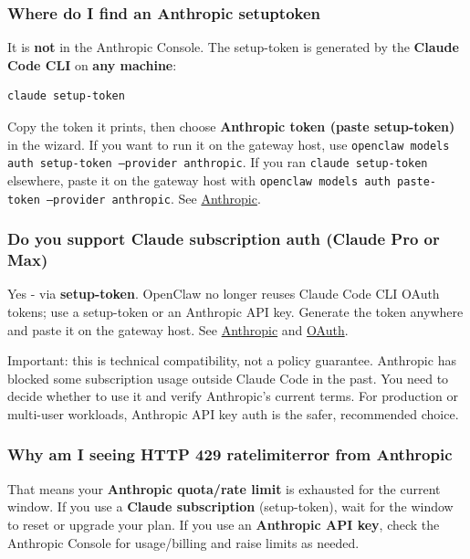 \subsubsection{Where do I find an Anthropic setuptoken}


It is \textbf{not} in the Anthropic Console. The setup-token is generated by the \textbf{Claude Code CLI} on \textbf{any machine}:

\begin{lstlisting}[language=bash]
claude setup-token
\end{lstlisting}


Copy the token it prints, then choose \textbf{Anthropic token (paste setup-token)} in the wizard. If you want to run it on the gateway host, use \texttt{openclaw models auth setup-token --provider anthropic}. If you ran \texttt{claude setup-token} elsewhere, paste it on the gateway host with \texttt{openclaw models auth paste-token --provider anthropic}. See \href{/providers/anthropic}{Anthropic}.

\subsubsection{Do you support Claude subscription auth (Claude Pro or Max)}


Yes - via \textbf{setup-token}. OpenClaw no longer reuses Claude Code CLI OAuth tokens; use a setup-token or an Anthropic API key. Generate the token anywhere and paste it on the gateway host. See \href{/providers/anthropic}{Anthropic} and \href{/concepts/oauth}{OAuth}.

Important: this is technical compatibility, not a policy guarantee. Anthropic
has blocked some subscription usage outside Claude Code in the past.
You need to decide whether to use it and verify Anthropic's current terms.
For production or multi-user workloads, Anthropic API key auth is the safer, recommended choice.

\subsubsection{Why am I seeing HTTP 429 ratelimiterror from Anthropic}


That means your \textbf{Anthropic quota/rate limit} is exhausted for the current window. If you
use a \textbf{Claude subscription} (setup-token), wait for the window to
reset or upgrade your plan. If you use an \textbf{Anthropic API key}, check the Anthropic Console
for usage/billing and raise limits as needed.

